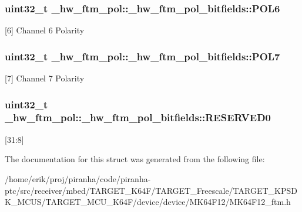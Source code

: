 \subsubsection[{\texorpdfstring{P\+O\+L6}{POL6}}]{\setlength{\rightskip}{0pt plus 5cm}uint32\+\_\+t \+\_\+hw\+\_\+ftm\+\_\+pol\+::\+\_\+hw\+\_\+ftm\+\_\+pol\+\_\+bitfields\+::\+P\+O\+L6}\hypertarget{struct__hw__ftm__pol_1_1__hw__ftm__pol__bitfields_a4c884129876d3c82d497d0f67688ac27}{}\label{struct__hw__ftm__pol_1_1__hw__ftm__pol__bitfields_a4c884129876d3c82d497d0f67688ac27}
\mbox{[}6\mbox{]} Channel 6 Polarity 
\subsubsection[{\texorpdfstring{P\+O\+L7}{POL7}}]{\setlength{\rightskip}{0pt plus 5cm}uint32\+\_\+t \+\_\+hw\+\_\+ftm\+\_\+pol\+::\+\_\+hw\+\_\+ftm\+\_\+pol\+\_\+bitfields\+::\+P\+O\+L7}\hypertarget{struct__hw__ftm__pol_1_1__hw__ftm__pol__bitfields_a17d9d520f75755c641b816b7ba566329}{}\label{struct__hw__ftm__pol_1_1__hw__ftm__pol__bitfields_a17d9d520f75755c641b816b7ba566329}
\mbox{[}7\mbox{]} Channel 7 Polarity 
\subsubsection[{\texorpdfstring{R\+E\+S\+E\+R\+V\+E\+D0}{RESERVED0}}]{\setlength{\rightskip}{0pt plus 5cm}uint32\+\_\+t \+\_\+hw\+\_\+ftm\+\_\+pol\+::\+\_\+hw\+\_\+ftm\+\_\+pol\+\_\+bitfields\+::\+R\+E\+S\+E\+R\+V\+E\+D0}\hypertarget{struct__hw__ftm__pol_1_1__hw__ftm__pol__bitfields_ab28ee083da6720293fa204fab4e05ca8}{}\label{struct__hw__ftm__pol_1_1__hw__ftm__pol__bitfields_ab28ee083da6720293fa204fab4e05ca8}
\mbox{[}31\+:8\mbox{]} 

The documentation for this struct was generated from the following file\+:\begin{DoxyCompactItemize}
\item 
/home/erik/proj/piranha/code/piranha-\/ptc/src/receiver/mbed/\+T\+A\+R\+G\+E\+T\+\_\+\+K64\+F/\+T\+A\+R\+G\+E\+T\+\_\+\+Freescale/\+T\+A\+R\+G\+E\+T\+\_\+\+K\+P\+S\+D\+K\+\_\+\+M\+C\+U\+S/\+T\+A\+R\+G\+E\+T\+\_\+\+M\+C\+U\+\_\+\+K64\+F/device/device/\+M\+K64\+F12/M\+K64\+F12\+\_\+ftm.\+h\end{DoxyCompactItemize}
